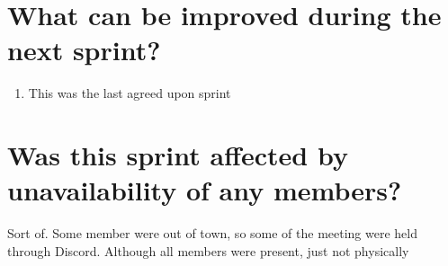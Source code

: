 \documentclass[11pt]{article}
\begin{document}
\section*{What can be improved during the next sprint?}
\begin{enumerate}
	\item This was the last agreed upon sprint
\end{enumerate} 


\section*{Was this sprint affected by unavailability of any members?}
Sort of. Some member were out of town, so some of the meeting were held through Discord. Although all members were present, just not physically
\end{document}
